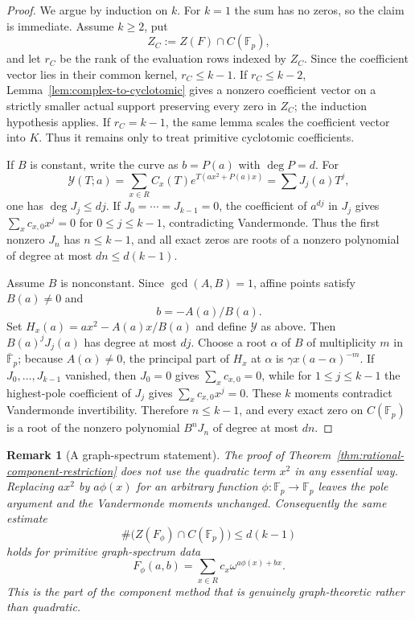 \documentclass[11pt]{article}
\newtheorem{remark}[theorem]{Remark}
\newcommand{\F}{\mathbb F}
\begin{document}
\begin{proof}
We argue by induction on $k$.  For $k=1$ the sum has no zeros, so the claim is immediate.  Assume $k\ge2$, put
\[
 Z_C:=Z(F)\cap C(\F_p),
\]
and let $r_C$ be the rank of the evaluation rows indexed by $Z_C$.
Since the coefficient vector lies in their common kernel, $r_C\le k-1$.
If $r_C\le k-2$, Lemma~\ref{lem:complex-to-cyclotomic} gives a nonzero
coefficient vector on a strictly smaller actual support preserving every
zero in $Z_C$; the induction hypothesis applies.  If $r_C=k-1$, the same
lemma scales the coefficient vector into $K$.  Thus it remains only to
treat primitive cyclotomic coefficients.

If $B$ is constant, write the curve as $b=P(a)$ with $\deg P=d$.  For
\[
 \mathcal Y(T;a)=\sum_{x\in R}C_x(T)e^{T(ax^2+P(a)x)}=\sum J_j(a)T^j,
\]
one has $\deg J_j\le dj$.  If $J_0=\cdots=J_{k-1}=0$, the coefficient of $a^{dj}$ in $J_j$ gives $\sum_xc_{x,0}x^j=0$ for $0\le j\le k-1$, contradicting Vandermonde.  Thus the first nonzero $J_n$ has $n\le k-1$, and all exact zeros are roots of a nonzero polynomial of degree at most $dn\le d(k-1)$.

Assume $B$ is nonconstant.  Since $\gcd(A,B)=1$, affine points satisfy $B(a)\ne0$ and
\[
 b=-A(a)/B(a).
\]
Set $H_x(a)=ax^2-A(a)x/B(a)$ and define $\mathcal Y$ as above.  Then $B(a)^jJ_j(a)$ has degree at most $dj$.  Choose a root $\alpha$ of $B$ of multiplicity $m$ in $\overline{\F}_p$; because $A(\alpha)\ne0$, the principal part of $H_x$ at $\alpha$ is $\gamma x(a-\alpha)^{-m}$.  If $J_0,\ldots,J_{k-1}$ vanished, then $J_0=0$ gives $\sum_xc_{x,0}=0$, while for $1\le j\le k-1$ the highest-pole coefficient of $J_j$ gives $\sum_xc_{x,0}x^j=0$.  These $k$ moments contradict Vandermonde invertibility.  Therefore $n\le k-1$, and every exact zero on $C(\F_p)$ is a root of the nonzero polynomial $B^nJ_n$ of degree at most $dn$.
\end{proof}

\begin{remark}[A graph-spectrum statement]
\label{rem:graph-spectrum-rational}
The proof of Theorem~\ref{thm:rational-component-restriction} does not
use the quadratic term \(x^2\) in any essential way.  Replacing
\(ax^2\) by \(a\phi(x)\) for an arbitrary function
\(\phi:\F_p\to\F_p\) leaves the pole argument and the Vandermonde
moments unchanged.  Consequently the same estimate
\[
 \#\bigl(Z(F_\phi)\cap C(\F_p)\bigr)\le d(k-1)
\]
holds for primitive graph-spectrum data
\[
 F_\phi(a,b)=\sum_{x\in R}c_x\omega^{a\phi(x)+bx}.
\]
This is the part of the component method that is genuinely
graph-theoretic rather than quadratic.
\end{remark}
\end{document}
